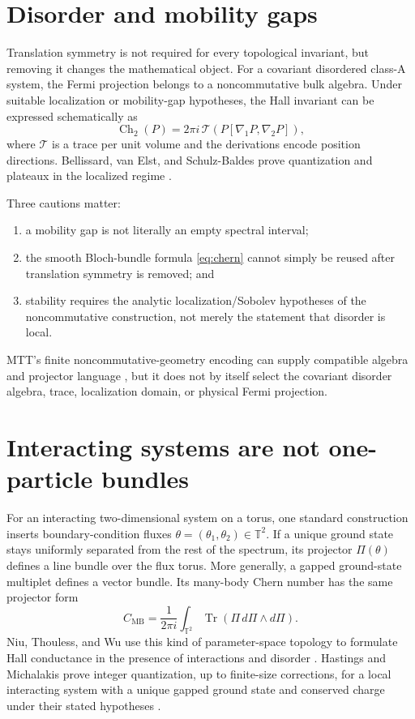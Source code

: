 \documentclass[11pt]{article}
\theoremstyle{definition}
\theoremstyle{remark}
\newcommand{\T}{\mathbb{T}}
\newcommand{\Tr}{\operatorname{Tr}}
\begin{document}
\section{Disorder and mobility gaps}
\label{sec:disorder}

Translation symmetry is not required for every topological invariant, but
removing it changes the mathematical object.  For a covariant disordered
class-A system, the Fermi projection belongs to a noncommutative bulk
algebra.  Under suitable localization or mobility-gap hypotheses, the Hall
invariant can be expressed schematically as
\[
 \operatorname{Ch}_2(P)
 =
 2\pi i\,\mathcal T\!\left(
 P[\nabla_1P,\nabla_2P]\right),
\]
where \(\mathcal T\) is a trace per unit volume and the derivations encode
position directions.  Bellissard, van Elst, and Schulz-Baldes prove
quantization and plateaux in the localized regime
\cite{Bellissard1994}.

Three cautions matter:
\begin{enumerate}
\item a mobility gap is not literally an empty spectral interval;
\item the smooth Bloch-bundle formula \cref{eq:chern} cannot simply be
  reused after translation symmetry is removed; and
\item stability requires the analytic localization/Sobolev hypotheses of
  the noncommutative construction, not merely the statement that disorder
  is local.
\end{enumerate}
MTT's finite noncommutative-geometry encoding can supply compatible algebra
and projector language \cite{NeroNCG}, but it does not by itself select the
covariant disorder algebra, trace, localization domain, or physical Fermi
projection.

\section{Interacting systems are not one-particle bundles}
\label{sec:interactions}

For an interacting two-dimensional system on a torus, one standard
construction inserts boundary-condition fluxes
\(\theta=(\theta_1,\theta_2)\in\T^2\).  If a unique ground state stays
uniformly separated from the rest of the spectrum, its projector
\(\Pi(\theta)\) defines a line bundle over the flux torus.  More generally, a
gapped ground-state multiplet defines a vector bundle.  Its many-body Chern
number has the same projector form
\[
 C_{\mathrm{MB}}
 =
 \frac{1}{2\pi i}\int_{\T^2}
 \Tr\!\left(\Pi\,d\Pi\wedge d\Pi\right).
\]
Niu, Thouless, and Wu use this kind of parameter-space topology to formulate
Hall conductance in the presence of interactions and disorder
\cite{Niu1985}.  Hastings and Michalakis prove integer quantization, up to
finite-size corrections, for a local interacting system with a unique
gapped ground state and conserved charge under their stated hypotheses
\cite{Hastings2015}.
\end{document}
